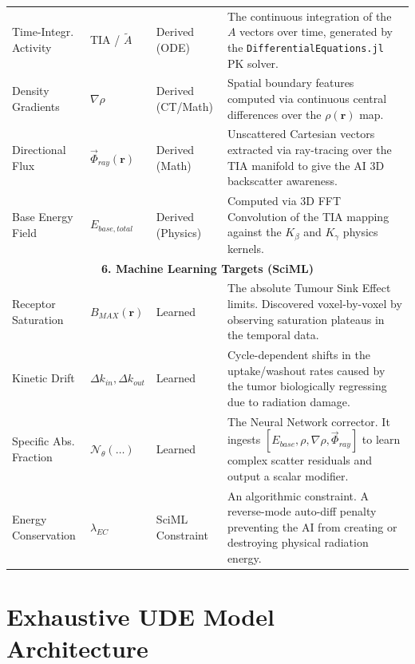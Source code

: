 \documentclass[11pt,a4paper]{article}
\begin{document}
\begin{table}[h!]
\begin{tabularx}{\textwidth}{@{}l l l X@{}}
Time-Integr. Activity & TIA / $\tilde{A}$ & Derived (ODE) & The continuous integration of the $A$ vectors over time, generated by the \texttt{DifferentialEquations.jl} PK solver. \\
Density Gradients & $\nabla \rho$ & Derived (CT/Math) & Spatial boundary features computed via continuous central differences over the $\rho(\mathbf{r})$ map. \\
Directional Flux & $\vec{\Phi}_{ray}(\mathbf{r})$ & Derived (Math) & Unscattered Cartesian vectors extracted via ray-tracing over the TIA manifold to give the AI 3D backscatter awareness. \\
Base Energy Field & $E_{base, total}$ & Derived (Physics) & Computed via 3D FFT Convolution of the TIA mapping against the $K_\beta$ and $K_\gamma$ physics kernels. \\ \midrule
\multicolumn{4}{c}{\textbf{6. Machine Learning Targets (SciML)}} \\ \midrule
Receptor Saturation & $B_{MAX}(\mathbf{r})$ & Learned & The absolute Tumour Sink Effect limits. Discovered voxel-by-voxel by observing saturation plateaus in the temporal data. \\
Kinetic Drift & $\Delta k_{in}, \Delta k_{out}$ & Learned & Cycle-dependent shifts in the uptake/washout rates caused by the tumor biologically regressing due to radiation damage. \\
Specific Abs. Fraction & $\mathcal{N}_\theta(\dots)$ & Learned & The Neural Network corrector. It ingests $[E_{base}, \rho, \nabla \rho, \vec{\Phi}_{ray}]$ to learn complex scatter residuals and output a scalar modifier. \\
Energy Conservation & $\lambda_{EC}$ & SciML Constraint & An algorithmic constraint. A reverse-mode auto-diff penalty preventing the AI from creating or destroying physical radiation energy. \\ \bottomrule
\end{tabularx}
\end{table}

\section{Exhaustive UDE Model Architecture}
\end{document}
